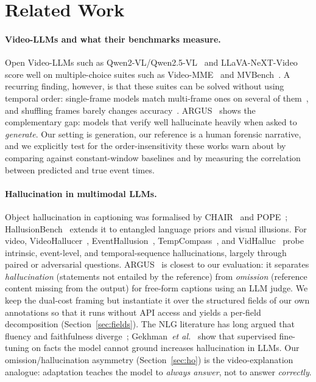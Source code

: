 \section{Related Work}
\label{sec:related}

\paragraph{Video-LLMs and what their benchmarks measure.}
Open Video-LLMs such as Qwen2-VL/Qwen2.5-VL~\cite{qwen2vl,qwen25vl} and LLaVA-NeXT-Video~\cite{llavanextvideo} score well on multiple-choice suites such as Video-MME~\cite{videomme} and MVBench~\cite{mvbench}.
A recurring finding, however, is that these suites can be solved without using temporal order: single-frame models match multi-frame ones on several of them~\cite{buch2022revisiting,lei2023singleframe}, and shuffling frames barely changes accuracy~\cite{tvbench}.
ARGUS~\cite{argus2025} shows the complementary gap: models that verify well hallucinate heavily when asked to \emph{generate}.
Our setting is generation, our reference is a human forensic narrative, and we explicitly test for the order-insensitivity these works warn about by comparing against constant-window baselines and by measuring the correlation between predicted and true event times.

\paragraph{Hallucination in multimodal LLMs.}
Object hallucination in captioning was formalised by CHAIR~\cite{rohrbach2018chair} and POPE~\cite{pope}; HallusionBench~\cite{hallusionbench} extends it to entangled language priors and visual illusions.
For video, VideoHallucer~\cite{videohallucer}, EventHallusion~\cite{eventhallusion}, TempCompass~\cite{tempcompass}, and VidHalluc~\cite{vidhalluc} probe intrinsic, event-level, and temporal-sequence hallucinations, largely through paired or adversarial questions.
ARGUS~\cite{argus2025} is closest to our evaluation: it separates \emph{hallucination} (statements not entailed by the reference) from \emph{omission} (reference content missing from the output) for free-form captions using an LLM judge.
We keep the dual-cost framing but instantiate it over the structured fields of our own \dataset{} annotations so that it runs without API access and yields a per-field decomposition (Section~\ref{sec:fields}).
The NLG literature has long argued that fluency and faithfulness diverge~\cite{maynez2020faithfulness,ji2023survey}; Gekhman~\emph{et al.}~\cite{gekhman2024finetuning} show that supervised fine-tuning on facts the model cannot ground increases hallucination in LLMs.
Our omission/hallucination asymmetry (Section~\ref{sec:ho}) is the video-explanation analogue: adaptation teaches the model to \emph{always answer}, not to answer \emph{correctly}.

